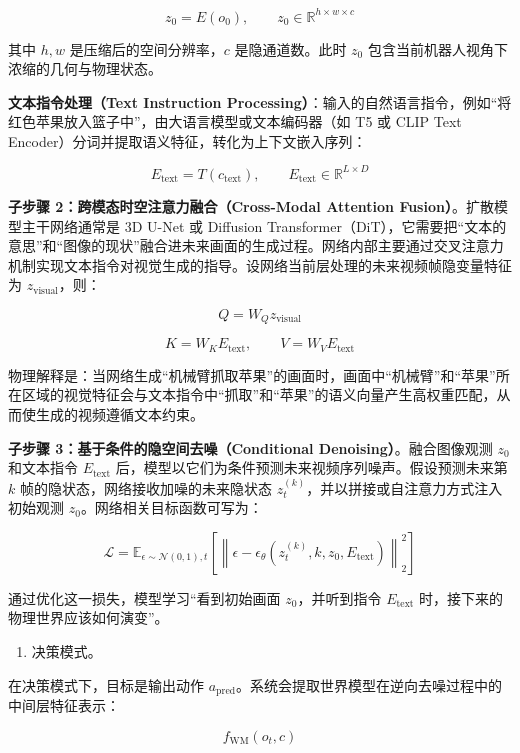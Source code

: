 \[
z_0 = E(o_0), \qquad z_0 \in \mathbb{R}^{h \times w \times c}
\]

其中 \(h,w\) 是压缩后的空间分辨率，\(c\) 是隐通道数。此时 \(z_0\) 包含当前机器人视角下浓缩的几何与物理状态。

\textbf{文本指令处理（Text Instruction Processing）}：输入的自然语言指令，例如``将红色苹果放入篮子中''，由大语言模型或文本编码器（如 T5 或 CLIP Text Encoder）分词并提取语义特征，转化为上下文嵌入序列：

\[
E_{\mathrm{text}} = T(c_{\mathrm{text}}), \qquad E_{\mathrm{text}} \in \mathbb{R}^{L \times D}
\]

\textbf{子步骤 2：跨模态时空注意力融合（Cross-Modal Attention Fusion）}。扩散模型主干网络通常是 3D U-Net 或 Diffusion Transformer（DiT），它需要把``文本的意思''和``图像的现状''融合进未来画面的生成过程。网络内部主要通过交叉注意力机制实现文本指令对视觉生成的指导。设网络当前层处理的未来视频帧隐变量特征为 \(z_{\mathrm{visual}}\)，则：

\[
Q = W_Q z_{\mathrm{visual}}
\]

\[
K = W_K E_{\mathrm{text}}, \qquad V = W_V E_{\mathrm{text}}
\]

物理解释是：当网络生成``机械臂抓取苹果''的画面时，画面中``机械臂''和``苹果''所在区域的视觉特征会与文本指令中``抓取''和``苹果''的语义向量产生高权重匹配，从而使生成的视频遵循文本约束。

\textbf{子步骤 3：基于条件的隐空间去噪（Conditional Denoising）}。融合图像观测 \(z_0\) 和文本指令 \(E_{\mathrm{text}}\) 后，模型以它们为条件预测未来视频序列噪声。假设预测未来第 \(k\) 帧的隐状态，网络接收加噪的未来隐状态 \(z_t^{(k)}\)，并以拼接或自注意力方式注入初始观测 \(z_0\)。网络相关目标函数可写为：

\[
\mathcal{L}
= \mathbb{E}_{\epsilon \sim \mathcal{N}(0,1), t}
\left[
\left\|
\epsilon - \epsilon_\theta \left(z_t^{(k)}, k, z_0, E_{\mathrm{text}}\right)
\right\|_2^2
\right]
\]

通过优化这一损失，模型学习``看到初始画面 \(z_0\)，并听到指令 \(E_{\mathrm{text}}\) 时，接下来的物理世界应该如何演变''。

\begin{enumerate}
\def\labelenumi{\arabic{enumi}.}
\setcounter{enumi}{1}
\tightlist
\item
  决策模式。
\end{enumerate}

在决策模式下，目标是输出动作 \(a_{\mathrm{pred}}\)。系统会提取世界模型在逆向去噪过程中的中间层特征表示：

\[
f_{\mathrm{WM}}(o_t, c)
\]

